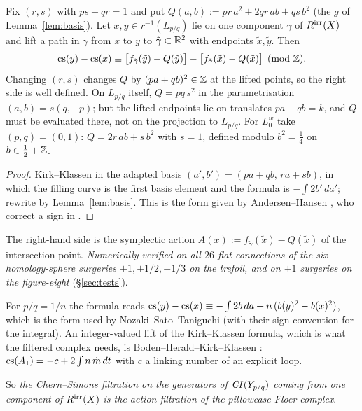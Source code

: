 \begin{proposition}\label{prop:action}
Fix $(r,s)$ with $ps-qr=1$ and put $Q(a,b):=pr\,a^2+2qr\,ab+qs\,b^2$ (the $g$ of Lemma~\ref{lem:basis}).  Let
$x,y\in r^{-1}(L_{p/q})$ lie on one component $\gamma$ of $R^{\rm irr}(X)$ and lift a path in $\gamma$ from $x$ to
$y$ to $\tilde\gamma\subset\mathbb{R}^2$ with endpoints $\tilde x,\tilde y$.  Then
\[
\mathrm{cs}(y)-\mathrm{cs}(x)\equiv\big[f_{\tilde\gamma}(\tilde y)-Q(\tilde y)\big]-\big[f_{\tilde\gamma}(\tilde x)-Q(\tilde x)\big]\pmod{\mathbb{Z}}.
\]
Changing $(r,s)$ changes $Q$ by $(pa+qb)^2\in\mathbb{Z}$ at the lifted points, so the right side is well defined.
On $L_{p/q}$ itself, $Q=pq\,s^2$ in the parametrisation $(a,b)=s(q,-p)$; but the lifted endpoints lie on
translates $pa+qb=k$, and $Q$ must be evaluated there, not on the projection to $L_{p/q}$.  For $L_0^w$
take $(p,q)=(0,1)$: $Q=2r\,ab+s\,b^2$ with $s=1$, defined modulo $b^2=\tfrac14$ on $b\in\tfrac12+\mathbb{Z}$.
\end{proposition}
\begin{proof}
Kirk--Klassen in the adapted basis $(a',b')=(pa+qb,\,ra+sb)$, in which the filling curve is the first basis
element and the formula is $-\int2b'\,da'$; rewrite by Lemma~\ref{lem:basis}.  This is the form
given by Andersen--Hansen \cite[eq.~(5.67)]{AH}, who correct a sign in \cite{KK90}.
\end{proof}
The right-hand side is the symplectic action $A(x):=f_{\tilde\gamma}(\tilde x)-Q(\tilde x)$ of the intersection point.
\emph{Numerically verified on all $26$ flat connections of the six homology-sphere surgeries $\pm1,\pm1/2,\pm1/3$ on the
trefoil, and on $\pm1$ surgeries on the figure-eight} (\S\ref{sec:tests}).

\begin{remark}
For $p/q=1/n$ the formula reads $\mathrm{cs}(y)-\mathrm{cs}(x)\equiv-\int 2b\,da+n\,(b(y)^2-b(x)^2)$, which is the form used by
Nozaki--Sato--Taniguchi \cite[Thm.~7.1]{NST} (with their sign convention for the integral).  An integer-valued
lift of the Kirk--Klassen formula, which is what the filtered complex needs, is Boden--Herald--Kirk--Klassen
\cite[Thm.~5.5]{BHKK}: $\mathrm{cs}(A_1)=-c+2\int n\,\dot m\,dt$ with $c$ a linking number of an explicit loop.
\end{remark}

So \emph{the Chern--Simons filtration on the generators of $\mathit{CI}(Y_{p/q})$ coming from one component of
$R^{\rm irr}(X)$ is the action filtration of the pillowcase Floer complex}.

